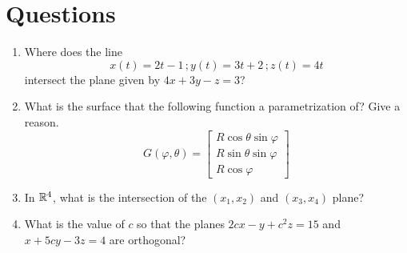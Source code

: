 \documentclass[12pt]{amsart}
\begin{document}
\section*{Questions}
\begin{problem}
    \begin{enumerate}
        \item Where does the line 
    \begin{equation*}
        x(t) = 2t-1 \,; y(t) = 3t + 2 \,; z(t) = 4t
    \end{equation*}
    intersect the plane given by $4x + 3y - z = 3$?
    \vspace{7cm}

\item What is the surface that the following function a parametrization of?
        Give a reason.
    \begin{equation*}
        G(\varphi, \theta) = \begin{bmatrix}
            R \cos \theta \sin \varphi \\
            R \sin \theta \sin \varphi \\
            R \cos \varphi
        \end{bmatrix}
    \end{equation*}

    \vspace{7cm}

    \newpage
\item 
    In $\mathbb{R}^4$, what is the intersection of the $(x_1, x_2)$ and $(x_3, x_4)$ plane?

    \vspace{10cm}

\item 
    What is the value of $c$ so that the planes
    $2cx - y + c^2z = 15$ and $x + 5cy - 3z = 4$ are orthogonal?
    \end{enumerate}
\end{problem}

\newpage
\end{document}
